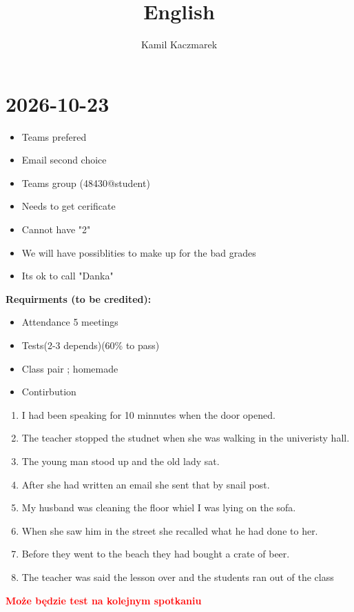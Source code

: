 \documentclass[]{article}
\title{English}
\author{Kamil Kaczmarek}
\begin{document}
\maketitle


\section{2026-10-23}
\begin{itemize}
	\item Teams prefered
	\item Email second choice
	\item Teams group (48430@student)
	\item Needs to get cerificate
	\item Cannot have "2"
	\item We will have possiblities to make up for the bad grades
	\item Its ok to call "Danka"
\end{itemize}
\textbf{Requirments (to be credited):}
\begin{itemize}
	\item Attendance 5 meetings
	\item Tests(2-3 depends)(60\% to pass)
	\item Class pair ; homemade
	\item Contirbution
\end{itemize}

\vspace{6mm}

\begin{enumerate}
	\item I had been speaking for 10 minnutes when the door opened. %
	\item The teacher stopped the studnet when she was walking in the univeristy hall. %
	\item The young man stood up and the old lady sat.
	\item After she had written an email she sent that by snail post. %
	\item My husband was cleaning the floor whiel I was lying on the sofa.
	\item When she saw him in the street she recalled what he had done to her.
	\item Before they went to the beach they had bought a crate of beer. %
	\item The teacher was said the lesson over and the students ran out of the class
\end{enumerate}
\Huge\textcolor{red}{\textbf{Może będzie test na kolejnym spotkaniu}}
\end{document}
